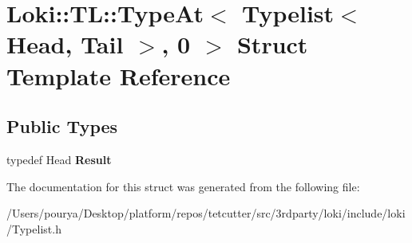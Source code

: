 \hypertarget{structLoki_1_1TL_1_1TypeAt_3_01Typelist_3_01Head_00_01Tail_01_4_00_010_01_4}{}\section{Loki\+:\+:T\+L\+:\+:Type\+At$<$ Typelist$<$ Head, Tail $>$, 0 $>$ Struct Template Reference}
\label{structLoki_1_1TL_1_1TypeAt_3_01Typelist_3_01Head_00_01Tail_01_4_00_010_01_4}
\subsection*{Public Types}
\begin{DoxyCompactItemize}
\item 
\hypertarget{structLoki_1_1TL_1_1TypeAt_3_01Typelist_3_01Head_00_01Tail_01_4_00_010_01_4_aace03cdec8b7b89bebd4a18ee26e7671}{}typedef Head {\bfseries Result}\label{structLoki_1_1TL_1_1TypeAt_3_01Typelist_3_01Head_00_01Tail_01_4_00_010_01_4_aace03cdec8b7b89bebd4a18ee26e7671}

\end{DoxyCompactItemize}


The documentation for this struct was generated from the following file\+:\begin{DoxyCompactItemize}
\item 
/\+Users/pourya/\+Desktop/platform/repos/tetcutter/src/3rdparty/loki/include/loki/Typelist.\+h\end{DoxyCompactItemize}

